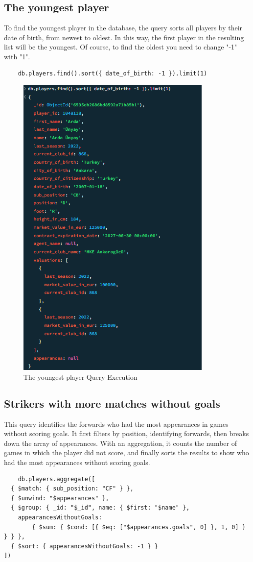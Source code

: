 \documentclass{Configuration_Files/PoliMi3i_thesis}
\begin{document}
\subsection{The youngest player}
To find the youngest player in the database, the query sorts all players by their date of birth, from newest to oldest. In this way, the first player in the resulting list will be the youngest. Of course, to find the oldest you need to change "-1" with "1".
\begin{verbatim}
    db.players.find().sort({ date_of_birth: -1 }).limit(1)
\end{verbatim}

\begin{figure}[htbp]
    \centering
    \includegraphics[scale=1.15]{Images/Queries/Youngest/y.png}
    \caption{The youngest player Query Execution}
\end{figure}

\subsection{Strikers with more matches without goals}
This query identifies the forwards who had the most appearances in games without scoring goals. It first filters by position, identifying forwards, then breaks down the array of appearances. With an aggregation, it counts the number of games in which the player did not score, and finally sorts the results to show who had the most appearances without scoring goals. 
\begin{verbatim}
    db.players.aggregate([
  { $match: { sub_position: "CF" } },
  { $unwind: "$appearances" },
  { $group: { _id: "$_id", name: { $first: "$name" },
    appearancesWithoutGoals: 
        { $sum: { $cond: [{ $eq: ["$appearances.goals", 0] }, 1, 0] } } } },
  { $sort: { appearancesWithoutGoals: -1 } }
])
\end{verbatim}
\end{document}
